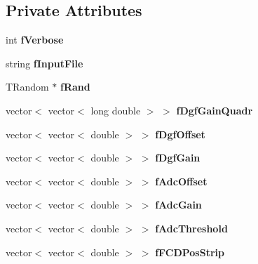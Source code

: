 \subsection*{Private Attributes}
\begin{DoxyCompactItemize}
\item 
\mbox{\label{class_calibration_a96000e6eb797044f6f1953c057e85003}} 
int {\bfseries f\+Verbose}
\item 
\mbox{\label{class_calibration_a5072ba7d40908bb42829ff655b94abbe}} 
string {\bfseries f\+Input\+File}
\item 
\mbox{\label{class_calibration_ac2ea5e39b43d6cfd913a75b2bf97ce9b}} 
T\+Random $\ast$ {\bfseries f\+Rand}
\item 
\mbox{\label{class_calibration_a7581e622bc7cc336e1c328335c7580dc}} 
vector$<$ vector$<$ long double $>$ $>$ {\bfseries f\+Dgf\+Gain\+Quadr}
\item 
\mbox{\label{class_calibration_ada08b4d5b7debaade1f0253c37246a91}} 
vector$<$ vector$<$ double $>$ $>$ {\bfseries f\+Dgf\+Offset}
\item 
\mbox{\label{class_calibration_a85ccd2f929fa2868b82fe24f492dface}} 
vector$<$ vector$<$ double $>$ $>$ {\bfseries f\+Dgf\+Gain}
\item 
\mbox{\label{class_calibration_ace07432ae8989b8309754d84a9d7e91e}} 
vector$<$ vector$<$ double $>$ $>$ {\bfseries f\+Adc\+Offset}
\item 
\mbox{\label{class_calibration_a0ee2c053390f1400db656aeed6d609ce}} 
vector$<$ vector$<$ double $>$ $>$ {\bfseries f\+Adc\+Gain}
\item 
\mbox{\label{class_calibration_a4f170a1f0a7e3db9199e2ffbf02d7daa}} 
vector$<$ vector$<$ double $>$ $>$ {\bfseries f\+Adc\+Threshold}
\item 
\mbox{\label{class_calibration_aa180b606b811ac4bd8a2db517c5302a3}} 
vector$<$ vector$<$ double $>$ $>$ {\bfseries f\+F\+C\+D\+Pos\+Strip}

\end{DoxyCompactItemize}
